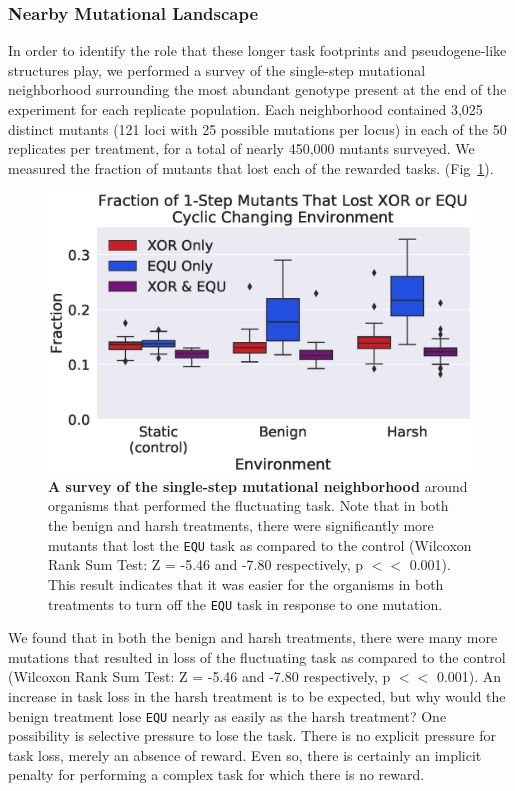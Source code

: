\documentclass[10pt,letterpaper,final]{article}
\begin{document}
\subsubsection*{Nearby Mutational Landscape}
In order to identify the role that these longer task footprints and pseudogene-like structures play, we performed a survey of the single-step mutational neighborhood surrounding the most abundant genotype present at the end of the experiment for each replicate population. Each neighborhood contained 3,025 distinct mutants (121 loci with 25 possible mutations per locus) in each of the 50 replicates per treatment, for a total of nearly 450,000 mutants surveyed. We measured the fraction of mutants that lost each of the rewarded tasks. (Fig~\ref{fig:CCE_single_step}). 

	\begin{figure}[!h] %
	\includegraphics[width=0.95\columnwidth]{figures/CE/fig10.eps}
	\caption{\textbf{A survey of the single-step mutational neighborhood} around organisms that performed the fluctuating task. Note that in both the benign and harsh treatments, there were significantly more mutants that lost the \texttt{EQU} task as compared to the control (Wilcoxon Rank Sum Test: Z = -5.46 and -7.80 respectively, p $<<$ 0.001). This result indicates that it was easier for the organisms in both treatments to turn off the \texttt{EQU} task in response to one mutation. 
	}\label{fig:CCE_single_step}
	\end{figure}


We found
that in both the benign and harsh treatments, there were many more mutations that resulted in loss of the fluctuating task as compared to the control (Wilcoxon Rank Sum Test: Z = -5.46 and -7.80 respectively, p $<<$ 0.001). An increase in task loss in the harsh treatment is to be expected, but why would the benign treatment lose \texttt{EQU} nearly as easily as the harsh treatment? One possibility is selective pressure to lose the task. There is no explicit pressure for task loss, merely an absence of reward. Even so, there is certainly an implicit penalty for performing a complex task for which there is no reward.
\end{document}
